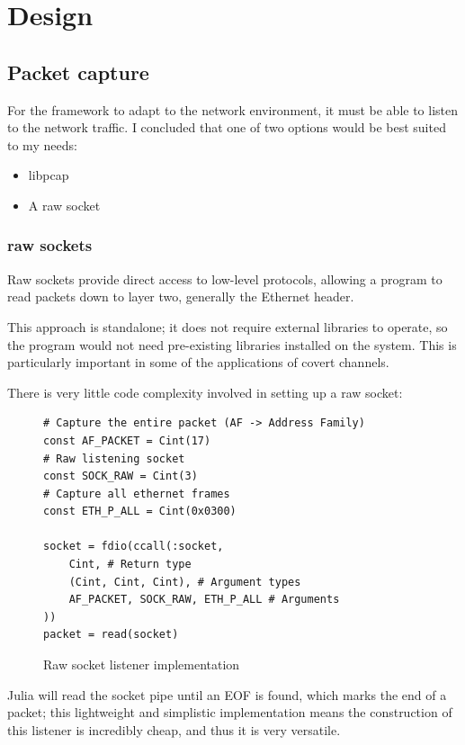\chapter{Design}
\label{ch:design}

\section{Packet capture}
\label{sec:packet_capture}

For the framework to adapt to the network environment, it must be able to listen to the network traffic.
I concluded that one of two options would be best suited to my needs:
\begin{itemize}
    \item libpcap
    \item A raw socket
\end{itemize}

\subsection{raw sockets}

Raw sockets provide direct access to low-level protocols, allowing a program to read packets down to layer two, generally the Ethernet header. 

This approach is standalone; it does not require external libraries to operate, so the program would not need pre-existing libraries installed on the system. This is particularly important in some of the applications of covert channels.

There is very little code complexity involved in setting up a raw socket:

\begin{figure}[h]
\begin{lstlisting}[language=JuliaLocal, style=julia]
# Capture the entire packet (AF -> Address Family)
const AF_PACKET = Cint(17) 
# Raw listening socket
const SOCK_RAW = Cint(3)
# Capture all ethernet frames
const ETH_P_ALL = Cint(0x0300)

socket = fdio(ccall(:socket,
    Cint, # Return type
    (Cint, Cint, Cint), # Argument types
    AF_PACKET, SOCK_RAW, ETH_P_ALL # Arguments
))
packet = read(socket)
\end{lstlisting}
\caption{Raw socket listener implementation}
\label{fig:raw_sock}
\end{figure}
Julia will read the socket pipe until an EOF is found, which marks the end of a packet; this lightweight and simplistic implementation means the construction of this listener is incredibly cheap, and thus it is very versatile.


